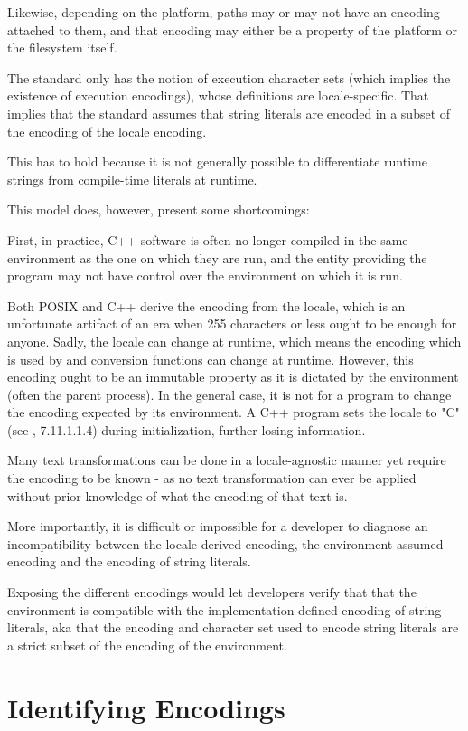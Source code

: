 \documentclass{wg21}
\begin{document}
Likewise, depending on the platform, paths may or may not have an encoding attached to them, and that encoding may either be a property of the platform or the filesystem itself.
\endnote


The standard only has the notion of execution character sets (which implies the existence of execution encodings), whose definitions are locale-specific.
That implies that the standard assumes that string literals are encoded in a subset of the encoding of the locale encoding.

This has to hold because it is not generally possible to differentiate runtime strings from compile-time literals at runtime.

This model does, however, present some shortcomings:

First, in practice, C++ software is often no longer compiled in the same environment as the one on which they are run, and the entity providing the program may not have control over the environment on which it is run.

Both POSIX and C++ derive the encoding from the locale, which is an unfortunate artifact of an era when 255 characters or less ought to be enough for anyone.
Sadly, the locale can change at runtime, which means the encoding which is used by  and conversion functions can change at runtime.
However, this encoding ought to be an immutable property as it is dictated by the environment (often the parent process).
In the general case, it is not for a program to change the encoding expected by its environment.
A C++ program sets the locale to "C" (see \cite{N2346}, 7.11.1.1.4) during initialization, further losing information.


Many text transformations can be done in a locale-agnostic manner yet require the encoding to be known - as no text transformation can ever be applied without
prior knowledge of what the encoding of that text is.

More importantly, it is difficult or impossible for a developer to diagnose an incompatibility between the locale-derived encoding, the environment-assumed encoding and
the encoding of string literals.

Exposing the different encodings would let developers verify that that the environment is compatible with the implementation-defined encoding of string literals, aka that the encoding and character set used to encode string literals are a strict subset of the encoding of the environment.

\section{Identifying Encodings}
\end{document}
